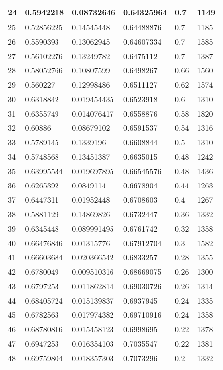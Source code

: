 \begin{longtable}{|l|l|l|l|l|l|}
24 & 0.5942218 & 0.08732646 & 0.64325964 & 0.7 & 1149 \\ \hline 
25 & 0.52856225 & 0.14545448 & 0.64488876 & 0.7 & 1185 \\ \hline 
26 & 0.5590393 & 0.13062945 & 0.64607334 & 0.7 & 1585 \\ \hline 
27 & 0.56102276 & 0.13249782 & 0.6475112 & 0.7 & 1387 \\ \hline 
28 & 0.58052766 & 0.10807599 & 0.6498267 & 0.66 & 1560 \\ \hline 
29 & 0.560227 & 0.12998486 & 0.6511127 & 0.62 & 1574 \\ \hline 
30 & 0.6318842 & 0.019454435 & 0.6523918 & 0.6 & 1310 \\ \hline 
31 & 0.6355749 & 0.014076417 & 0.6558876 & 0.58 & 1820 \\ \hline 
32 & 0.60886 & 0.08679102 & 0.6591537 & 0.54 & 1316 \\ \hline 
33 & 0.5789145 & 0.1339196 & 0.6608844 & 0.5 & 1310 \\ \hline 
34 & 0.5748568 & 0.13451387 & 0.6635015 & 0.48 & 1242 \\ \hline 
35 & 0.63995534 & 0.019697895 & 0.66545576 & 0.48 & 1436 \\ \hline 
36 & 0.6265392 & 0.0849114 & 0.6678904 & 0.44 & 1263 \\ \hline 
37 & 0.6447311 & 0.01952448 & 0.6708603 & 0.4 & 1267 \\ \hline 
38 & 0.5881129 & 0.14869826 & 0.6732447 & 0.36 & 1332 \\ \hline 
39 & 0.6345448 & 0.089991495 & 0.6761742 & 0.32 & 1358 \\ \hline 
40 & 0.66476846 & 0.01315776 & 0.67912704 & 0.3 & 1582 \\ \hline 
41 & 0.66603684 & 0.020366542 & 0.6833257 & 0.28 & 1355 \\ \hline 
42 & 0.6780049 & 0.009510316 & 0.68669075 & 0.26 & 1300 \\ \hline 
43 & 0.6797253 & 0.011862814 & 0.69030726 & 0.26 & 1314 \\ \hline 
44 & 0.68405724 & 0.015139837 & 0.6937945 & 0.24 & 1335 \\ \hline 
45 & 0.6782563 & 0.017974382 & 0.69710916 & 0.24 & 1358 \\ \hline 
46 & 0.68780816 & 0.015458123 & 0.6998695 & 0.22 & 1378 \\ \hline 
47 & 0.6947253 & 0.016354103 & 0.7035547 & 0.22 & 1381 \\ \hline 
48 & 0.69759804 & 0.018357303 & 0.7073296 & 0.2 & 1332 \\ \hline 

\end{longtable}
